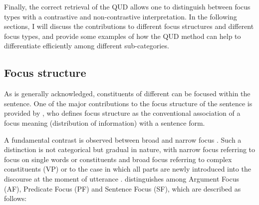 Finally, the correct retrieval of the QUD allows one to distinguish between focus types with a contrastive and non-contrastive interpretation. In the following sections, I will discuss the contributions to different focus structures and different focus types, and provide some examples of how the QUD method can help to differentiate efficiently among different sub-categories.

\subsection{Focus structure}
As is generally acknowledged, constituents of different  can be focused within the sentence. One of the major contributions to the focus structure of the sentence is provided by \textcite{lambrecht1996information}, who defines focus structure as the conventional association of a focus meaning (distribution of information) with a sentence form. 

A fundamental contrast is observed between broad and narrow focus \parencite{selkirk1984phonology, lambrecht1996information}. Such a distinction is not categorical but gradual in nature, with narrow focus referring to focus on single words or constituents and broad focus referring to complex constituents (VP) or to the case in which all parts are newly introduced into the discourse at the moment of utterance \parencite{fery2008information}.
\textcite[611]{lambrecht2000subjects} distinguishes among Argument Focus (AF), Predicate Focus (PF) and Sentence Focus (SF), which are described as follows:

